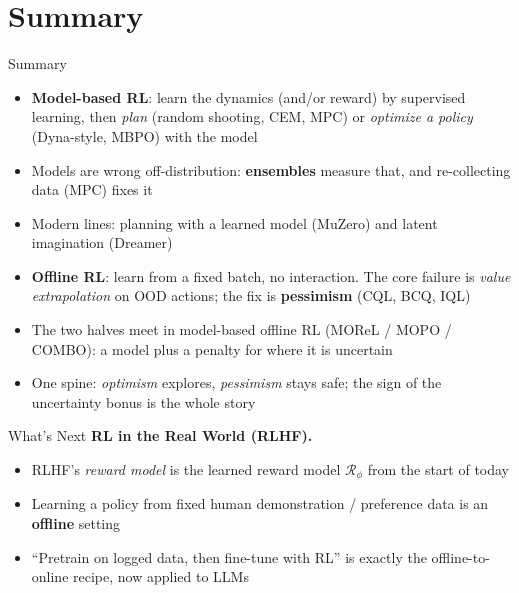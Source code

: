 \section{Summary}
\begin{frame}{Summary}
\begin{itemize}
    \item \textbf{Model-based RL}: learn the dynamics (and/or reward) by
          supervised learning, then \emph{plan} (random shooting, CEM, MPC) or
          \emph{optimize a policy} (Dyna-style, MBPO) with the model
    \item Models are wrong off-distribution: \textbf{ensembles} measure that,
          and re-collecting data (MPC) fixes it
    \item Modern lines: planning with a learned model (MuZero) and latent
          imagination (Dreamer)
    \item \textbf{Offline RL}: learn from a fixed batch, no interaction. The core
          failure is \emph{value extrapolation} on OOD actions; the fix is
          \textbf{pessimism} (CQL, BCQ, IQL)
    \item The two halves meet in model-based offline RL (MOReL / MOPO / COMBO):
          a model plus a penalty for where it is uncertain
    \item One spine: \emph{optimism} explores, \emph{pessimism} stays safe; the
          sign of the uncertainty bonus is the whole story
\end{itemize}
\end{frame}

\begin{frame}{What's Next}
\textbf{RL in the Real World (RLHF).}
\begin{itemize}
    \item RLHF's \emph{reward model} is the learned reward model $\mathcal{R}_\phi$
          from the start of today
    \item Learning a policy from fixed human demonstration / preference data is an
          \textbf{offline} setting
    \item ``Pretrain on logged data, then fine-tune with RL'' is exactly the
          offline-to-online recipe, now applied to LLMs
\end{itemize}
\end{frame}
